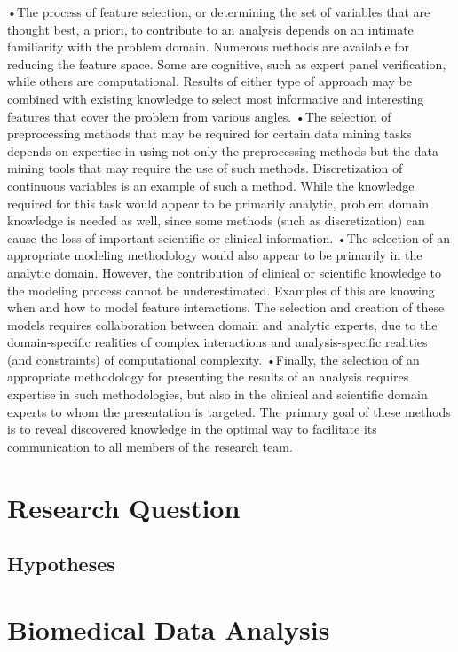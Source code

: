 \documentclass[10pt,a4paper]{article}
\begin{document}
	•The process of feature selection, or determining the set of variables that are thought best, a priori, to contribute to an analysis depends on an intimate familiarity with the problem domain. Numerous methods are available for reducing the feature space. Some are cognitive, such as expert panel verification, while others are computational. Results of either type of approach may be combined with existing knowledge to select most informative and interesting features that cover the problem from various angles.
	•The selection of preprocessing methods that may be required for certain data mining tasks depends on expertise in using not only the preprocessing methods but the data mining tools that may require the use of such methods. Discretization of continuous variables is an example of such a method. While the knowledge required for this task would appear to be primarily analytic, problem domain knowledge is needed as well, since some methods (such as discretization) can cause the loss of important scientific or clinical information.
	•The selection of an appropriate modeling methodology would also appear to be primarily in the analytic domain. However, the contribution of clinical or scientific knowledge to the modeling process cannot be underestimated. Examples of this are knowing when and how to model feature interactions. The selection and creation of these models requires collaboration between domain and analytic experts, due to the domain-specific realities of complex interactions and analysis-specific realities (and constraints) of computational complexity.
	•Finally, the selection of an appropriate methodology for presenting the results of an analysis requires expertise in such methodologies, but also in the clinical and scientific domain experts to whom the presentation is targeted. The primary goal of these methods is to reveal discovered knowledge in the optimal way to facilitate its communication to all members of the research team.\cite{zupan2006knowledge}
	
	\section{Research Question}
	
	\subsection{Hypotheses}
	
	 
	
	
	\appendix
	
	\clearpage
	
	\section{Biomedical Data Analysis}
	\label{sec:BiomedicalDataAnalysis}
	
	
	
\end{document}
